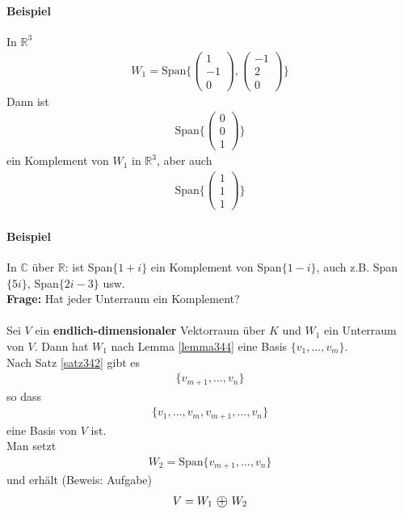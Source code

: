 \documentclass[11pt]{report}
\newcommand*\directsum{%
\text{ \textcircled{+} }
}
\newcommand*\Zb[1] {\mathbb{#1}}
\newcommand*\f[1] {\textbf{#1}}
\begin{document}
\paragraph{Beispiel}
In $\Zb{R}^3$
\begin{align}
 W_1 = \text{Span}\{\begin{pmatrix} 1 \\ -1 \\ 0 \end{pmatrix}, \begin{pmatrix} -1 \\ 2\\ 0 \end{pmatrix}\}
\end{align}
Dann ist 
\begin{align}
 \text{Span}\{\begin{pmatrix} 0 \\ 0 \\ 1\end{pmatrix}\}
\end{align}
ein Komplement von $W_1$ in $\Zb{R}^3$, aber auch 
\begin{align}
 \text{Span}\{\begin{pmatrix} 1 \\ 1 \\ 1\end{pmatrix}\}
\end{align}

\paragraph{Beispiel}
In $\Zb{C}$ über $\Zb{R}$: ist Span$\{1+i\}$ ein Komplement von Span$\{1-i\}$, auch z.B. Span$\{5i\}$, Span$\{2i-3\}$ usw.\\
\f{Frage:} Hat jeder Unterraum ein Komplement?\\\\
Sei $V$ ein \f{endlich-dimensionaler} Vektorraum über $K$ und $W_1$ ein Unterraum von $V$. Dann hat $W_1$ nach Lemma \ref{lemma344} eine Basis $\{v_1, ..., v_m\}$.\\
Nach Satz \ref{satz342} gibt es
\begin{align}
\{v_{m+1}, ..., v_n\}
\end{align}
so dass
\begin{align}
 \{v_1, ..., v_m, v_{m+1}, ..., v_n\}
\end{align}
eine Basis von $V$ ist. \\
Man setzt
\begin{align}
 W_2 = \text{Span}\{v_{m+1}, ..., v_n\}
\end{align}
und erhält (Beweis: Aufgabe)
\begin{align}
 V = W_1 \directsum W_2
\end{align}
\end{document}
